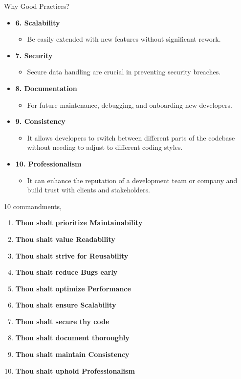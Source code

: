 \documentclass[10pt]{beamer}
\begin{document}
\begin{frame}{Why Good Practices?}
  \begin{itemize}
    \item \textbf{6. Scalability}
    \begin{itemize}
      \item Be easily extended with new features without significant rework.
    \end{itemize}
    \item \textbf{7. Security}
    \begin{itemize}
      \item Secure data handling are crucial in preventing security breaches.
    \end{itemize}
    \item \textbf{8. Documentation}
    \begin{itemize}
      \item For future maintenance, debugging, and onboarding new developers.
    \end{itemize}
    \item \textbf{9. Consistency}
    \begin{itemize}
      \item It allows developers to switch between different parts of the codebase without needing to adjust to different coding styles.
    \end{itemize}
    \item \textbf{10. Professionalism}
    \begin{itemize}
      \item It can enhance the reputation of a development team or company and build trust with clients and stakeholders.
    \end{itemize}
  \end{itemize}
\end{frame}


\begin{frame}{10 commandments,}
  \begin{enumerate}
    \item \textbf{Thou shalt prioritize Maintainability}
    \item \textbf{Thou shalt value Readability}
    \item \textbf{Thou shalt strive for Reusability}
    \item \textbf{Thou shalt reduce Bugs early}
    \item \textbf{Thou shalt optimize Performance}
    \item \textbf{Thou shalt ensure Scalability}
    \item \textbf{Thou shalt secure thy code}
    \item \textbf{Thou shalt document thoroughly}
    \item \textbf{Thou shalt maintain Consistency}
    \item \textbf{Thou shalt uphold Professionalism}
  \end{enumerate}
\end{frame}
\end{document}
